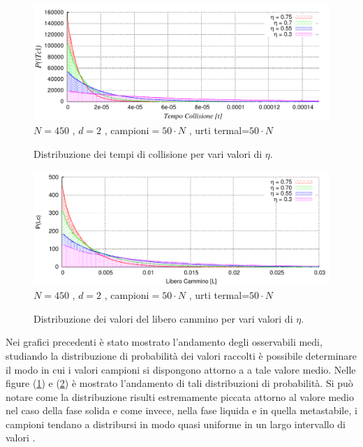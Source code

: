 \documentclass[11pt]{article}
\theoremstyle{plain}
\theoremstyle{remark}
\begin{document}
\begin{figure}[htbp]
\centering
	\caption[Sfere Rigide$/$Problema3.cpp]{Distribuzione dei tempi di collisione per vari valori di $\eta$.}\vspace{-15pt}
	\includegraphics[scale=0.95]{Immagini/Rigide/DistroTc2D}
\newline \footnotesize{$N= 450$ , $d=2$ , campioni$= 50\cdot N$ ,  urti termal=$ 50 \cdot N$}
	\label{fig: DistroTc}
\end{figure}

\begin{figure}[htbp]
\centering
	\caption[Sfere Rigide$/$Problema4\_2.cpp]{Distribuzione dei valori del libero cammino per vari valori di $\eta$.}\vspace{-15pt}
	\includegraphics[scale=0.95]{Immagini/Rigide/DistroLc2D}
	\newline \footnotesize{$N= 450$ , $d=2$ , campioni$= 50\cdot N$ ,  urti termal=$ 50 \cdot N$}
	\label{fig: DistroLc}
\end{figure}
Nei grafici precedenti è stato mostrato l'andamento degli osservabili medi, studiando la distribuzione di probabilità dei valori raccolti è possibile determinare il modo in cui i valori campioni si dispongono attorno a a tale valore medio.
Nelle figure (\ref{fig: DistroTc}) e (\ref{fig: DistroLc}) è mostrato l'andamento di tali distribuzioni di probabilità. Si può notare come la distribuzione risulti estremamente piccata attorno al valore medio nel caso della fase solida e come invece, nella fase liquida e in quella metastabile, i campioni tendano a distribursi in modo quasi uniforme in un largo intervallo di valori .
\end{document}
